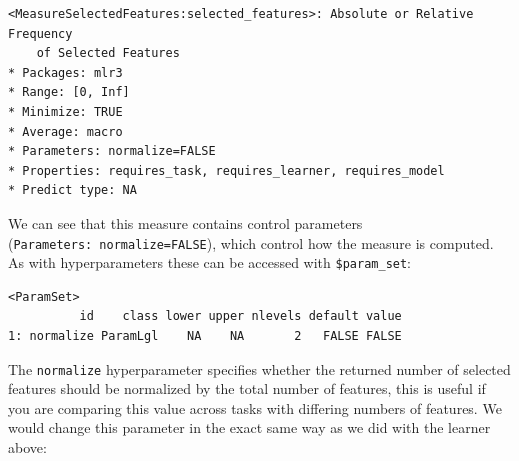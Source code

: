 \begin{verbatim}
<MeasureSelectedFeatures:selected_features>: Absolute or Relative Frequency
	of Selected Features
* Packages: mlr3
* Range: [0, Inf]
* Minimize: TRUE
* Average: macro
* Parameters: normalize=FALSE
* Properties: requires_task, requires_learner, requires_model
* Predict type: NA
\end{verbatim}

We can see that this measure contains control
parameters (\texttt{Parameters:\ normalize=FALSE}),
which control how the measure is computed. As with hyperparameters these
can be accessed with
\texttt{\$param\_set}:

\begin{Shaded}
\begin{Highlighting}[]
\OtherTok{=} \NormalTok{(}\NormalTok{)}
\SpecialCharTok{$}
\end{Highlighting}
\end{Shaded}

\begin{verbatim}
<ParamSet>
          id    class lower upper nlevels default value
1: normalize ParamLgl    NA    NA       2   FALSE FALSE
\end{verbatim}

The \texttt{normalize} hyperparameter specifies whether the returned
number of selected features should be normalized by the total number of
features, this is useful if you are comparing this value across tasks
with differing numbers of features. We would change this parameter in
the exact same way as we did with the learner above:

\begin{Shaded}
\begin{Highlighting}[]
\SpecialCharTok{$}\SpecialCharTok{$}\SpecialCharTok{$}\OtherTok{=} 
\SpecialCharTok{$}
\end{Highlighting}
\end{Shaded}

